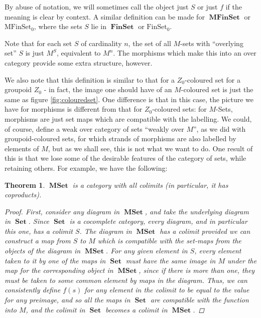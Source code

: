 \documentclass{amsart} \usepackage{amsmath,amssymb,bbm}
\newcommand{\opname}[1]{\operatorname{#1}}
\newcommand{\catname}[1]{\boldsymbol{\opname{{#1}}}}
\newcommand{\FSN}{\catname{FinSet_0}}
\newcommand{\MFSN}{\catname{MFinSet_0}}
\newcommand{\Set}{\catname{Set}}
\newtheorem{theorem}{Theorem}
\begin{document}
By abuse of notation, we will sometimes call the object just $S$ or
just $f$ if the meaning is clear by context.  A similar definition can
be made for $\catname{MFinSet}$ or $\MFSN$, where the sets $S$ lie in
$\catname{FinSet}$ or $\FSN$.

Note that for each set $S$ of cardinality $n$, the set of all $M$-sets
with ``overlying set'' $S$ is just $M^S$, equivalent to $M^n$.  The
morphisms which make this into an over category provide some extra
structure, however.

We also note that this definition is similar to that for a
$Z_0$-coloured set for a groupoid $Z_0$ - in fact, the image one
should have of an $M$-coloured set is just the same as figure
\ref{fig:colouredset}.  One difference is that in this case, the
picture we have for morphisms is different from that for
$Z_0$-coloured sets: for $M$-Sets, morphisms are just set maps which
are compatible with the labelling.  We could, of course, define a weak
over category of sets ``weakly over $M$'', as we did with
groupoid-coloured sets, for which strands of morphisms are also
labelled by elements of $M$, but as we shall see, this is not what we
want to do.  One result of this is that we lose some of the desirable
features of the category of sets, while retaining others.  For
example, we have the following:

\begin{theorem}
  $\catname{MSet}$ is a category with all colimits (in particular, it
  has coproducts).  
  
  \begin{proof}
    First, consider any diagram in $\catname{MSet}$, and take the
    underlying diagram in $\Set$.  Since $\Set$ is a cocomplete
    category, every diagram, and in particular this one, has a colimit
    $S$.  The diagram in $\catname{MSet}$ has a colimit provided we
    can construct a map from $S$ to $M$ which is compatible with the
    set-maps from the objects of the diagram in $\catname{MSet}$.  For
    any given element in $S$, every element taken to it by one of the
    maps in $\Set$ must have the same image in $M$ under the map for
    the corresponding object in $\catname{MSet}$, since if there is
    more than one, they must be taken to some common element by maps
    in the diagram.  Thus, we can consistently define $f(s)$ for any
    element in the colimit to be equal to the value for any preimage,
    and so all the maps in $\Set$ are compatible with the function
    into $M$, and the colimit in $\Set$ becomes a colimit in
    $\catname{MSet}$.
  \end{proof}
\end{theorem}
\end{document}
